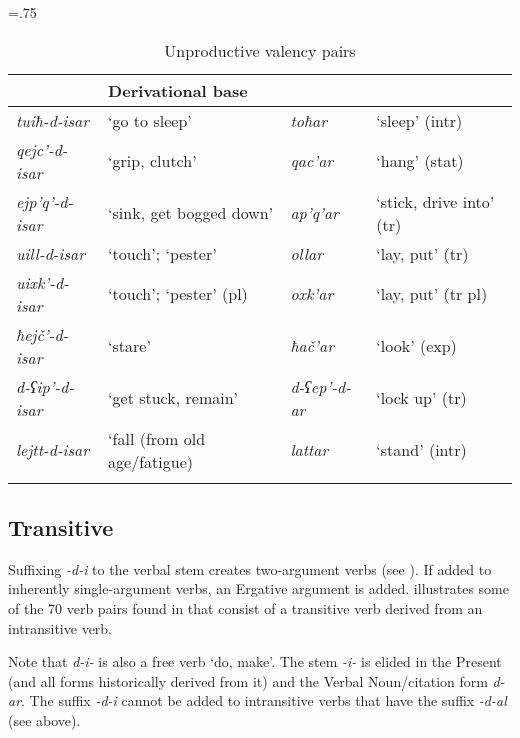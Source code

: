\begin{table}
\tabcolsep=.75\tabcolsep
\begin{tabular}{llll}
	\lsptoprule
	\multicolumn{2}{l}{Derived verb} & \multicolumn{2}{l}{Derivational base}  \\
	\midrule
	\textit{tuiħ-d-isar} & `go to sleep' & \textit{toħar} & `sleep' (intr) \\
	\textit{qejc'-d-isar} & `grip, clutch' & \textit{qac'ar} & `hang' (stat) \\
	\textit{ejp'q'-d-isar} & `sink, get bogged down' & \textit{ap'q'ar} & `stick, drive into' (tr) \\
	\textit{uill-d-isar} & `touch'; `pester' & \textit{ollar} & `lay, put' (tr) \\
	\textit{uixk'-d-isar} & `touch'; `pester' (pl) & \textit{oxk'ar} & `lay, put' (tr pl) \\
	\textit{ħejč'-d-isar} & `stare' & \textit{ħač'ar} & `look' (exp) \\
	\textit{d-ʕip'-d-isar} & `get stuck, remain' & \textit{d-ʕep'-d-ar} & `lock up' (tr) \\
	\textit{lejtt-d-isar} & `fall (from old age/fatigue) & \textit{lattar} & `stand' (intr) \\
	\lspbottomrule
\end{tabular}
\caption{Unproductive valency pairs}
\label{verbderiv-table6}
\end{table}

\subsection{Transitive} \label{tr}
Suffixing \textit{-d-i} to the verbal stem creates two-argument verbs (see \cites[130]{desheriev53}{chrelashvili90}). If added to inherently single-argument verbs, an Ergative argument is added.  illustrates some of the 70 verb pairs found in \textcite{kadkad84} that consist of a transitive verb derived from an intransitive verb. 


Note that \textit{d-i-} is also a free verb `do, make'. The stem \textit{-i-} is elided in the Present (and all forms historically derived from it) and the Verbal Noun/citation form \textit{d-ar}. The suffix \textit{-d-i} cannot be added to intransitive verbs that have the suffix \textit{-d-al} (see  above).

